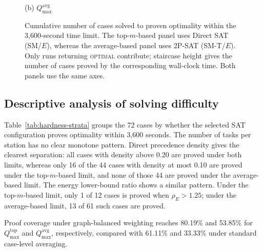 \documentclass[]{interact}
\theoremstyle{plain}
\theoremstyle{definition}
\theoremstyle{remark}
\begin{document}
\begin{figure}[H]
\begin{minipage}{0.49\textwidth}
\par\smallskip\footnotesize (b) $Q^{\mathrm{avg}}_{\max}$
\end{minipage}
\caption{Cumulative number of cases solved to proven optimality within the 3,600-second time limit. The top-$m$-based panel uses Direct SAT (SM/$E$), whereas the average-based panel uses 2P-SAT (SM-T/$E$). Only runs returning \textsc{optimal} contribute; staircase height gives the number of cases proved by the corresponding wall-clock time. Both panels use the same axes.}
\label{fig:cactus}
\end{figure}

\FloatBarrier
\subsection{Descriptive analysis of solving difficulty}

Table~\ref{tab:hardness-strata} groups the 72 cases by whether the selected SAT configuration proves optimality within 3,600 seconds. The number of tasks per station has no clear monotone pattern. Direct precedence density gives the clearest separation: all cases with density above 0.20 are proved under both limits, whereas only 16 of the 44 cases with density at most 0.10 are proved under the top-$m$-based limit, and none of those 44 are proved under the average-based limit. The energy lower-bound ratio shows a similar pattern. Under the top-$m$-based limit, only 1 of 12 cases is proved when $\rho_E>1.25$; under the average-based limit, 13 of 61 such cases are proved.

Proof coverage under graph-balanced weighting reaches 80.19\% and 53.85\% for $Q_{\max}^{\mathrm{top}}$ and $Q_{\max}^{\mathrm{avg}}$, respectively, compared with 61.11\% and 33.33\% under standard case-level averaging.
\end{document}
